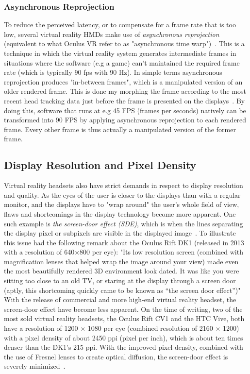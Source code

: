 \subsubsection{Asynchronous Reprojection}
To reduce the perceived latency, or to compensate for a frame rate that is too low, several virtual reality HMDs make use of \textit{asynchronous reprojection}
(equivalent to what Oculus VR refer to as "asynchronous time warp")~\citep{GD2016}. This is a technique in which the virtual reality system generates intermediate frames 
in situations where the software (e.g a game) can't maintained the required frame rate (which is typically 90 fps with 90 Hz). In simple terms asynchronous reprojection 
produces "in-between frames", which is a manipulated version of an older rendered frame. This is done my morphing the frame according to the most recent head tracking data just 
before the frame is presented on the displays~\citep{GD2016}. By doing this, software that runs at e.g 45 FPS (frames per seconds) natively can be transformed into 90 FPS by 
applying asynchronous reprojection to each rendered frame. Every other frame is thus actually a manipulated version of the former frame. 

\subsection{Display Resolution and Pixel Density}
Virtual reality headsets also have strict demands in respect to display resolution and quality. As the eyes of the user is closer
to the displays than with a regular monitor, and the displays have to "wrap around" the user's whole field of view, flaws and shortcomings in the display technology 
become more apparent. 
One such example is \textit{the screen-door effect (SDE)}, which is when the lines separating the display pixel or subpixels are visible in the displayed image~\citep{TC2016}. 
To illustrate this issue \citet{TC2016} had the following remark about the Oculus Rift DK1 (released in 2013 with a resolution of 640×800 per eye):
"Its low resolution screen (combined with magnification lenses that helped wrap the image around your view) made even the most beautifully rendered 3D environment look dated. 
It was like you were sitting too close to an old TV, or staring at the display through a screen door (aptly, this shortcoming quickly came to be known as “the screen door effect”)"
With the release of commercial and more high-end virtual reality headset, the screen-door effect have become less apparent.
On the time of writing, two of the most sold virtual reality headsets, the Oculus Rift CV1 and the HTC Vive, both have a resolution of 1200 × 1080 per eye (combined 
resolution of 2160 × 1200) with a pixel density of about 2450 ppi (pixel per inch), which is about ten times denser than the DK1's 215 ppi. 
With the improved pixel density, combined with the use of Fresnel lenses to create optical diffusion, the screen-door effect is severely minimized~\citep{Davies2016}. 

